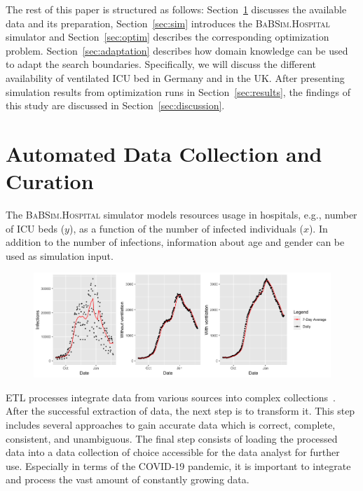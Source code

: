 \documentclass[conference]{IEEEtran}
\newcommand{\babsimhospital}{\textsc{BaBSim.Hospital}\xspace}
\begin{document}
The rest of this paper is structured as follows: 
Section~\ref{sec:data} discusses the available data and its preparation,
Section~\ref{sec:sim} introduces the \babsimhospital simulator and 
Section~\ref{sec:optim} describes the corresponding optimization problem. 
Section~\ref{sec:adaptation} describes how domain knowledge can be used to adapt the search boundaries.
Specifically, we will discuss the different availability of ventilated \gls{ICU} bed in Germany and in the UK.
After presenting simulation results from optimization runs in  Section~\ref{sec:results}, the findings of this study are discussed in Section~\ref{sec:discussion}.

\section{Automated Data Collection and Curation}\label{sec:data}
The \babsimhospital simulator models 
 resources usage in hospitals, e.g., number of \gls{ICU} beds ($y$), as a function 
of the number of infected individuals ($x$).
In addition to the number of infections, information about age and gender can be used as simulation input.
\begin{figure}[tb]
    \centering
    \includegraphics[width=0.97\linewidth]{rkiDiviData.png}
    \caption{}
\label{fig:rki}
\end{figure}
\gls{ETL} processes integrate data from various sources into complex collections~\citep{ELSAPPAGH201191}. 
After the successful extraction of data, the next step is to transform it. 
This step includes several approaches to gain accurate data which is correct, complete, consistent, and unambiguous.  
The final step consists of loading the processed data into a data collection of choice accessible for the data analyst for further use.
Especially in terms of the COVID-19 pandemic, it is important to integrate and process the vast amount of constantly growing data. 
\end{document}
